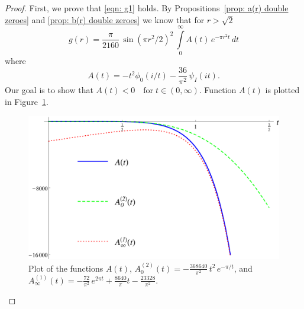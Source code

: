   \begin{proof}
  First, we prove that \eqref{eqn: g1} holds. By Propositions~\ref{prop: a(r) double zeroes} and \ref{prop: b(r) double zeroes} we know that for $r>\sqrt{2}$
  \begin{equation}\label{eqn: g A} g(r)=\frac{\pi}{2160}\,\sin(\pi r^2/2)^2\,\int\limits_0^\infty A(t)\,e^{-\pi r^2 t}\,dt\end{equation}
  where $$A(t)=-t^2\phi_0(i/t)-\frac{36}{\pi^2}\,\psi_I(it).$$
  Our goal is to show that $A(t)<0\quad\mbox{for}\;t\in(0,\infty).$ Function $A(t)$ is plotted in Figure~\ref{fig: A}.
  \begin{figure}[h!]
  \caption{Plot of the functions $A(t)$, $A^{(2)}_0(t)=-\frac{368640}{\pi^2}\,t^2\,e^{-\pi /t}$, and $A^{(1)}_\infty(t)=-\frac{72}{\pi^2}\,e^{2\pi t}+\frac{8640}{\pi}t-\frac{23328}{\pi^2}$.\label{fig: A}}
    \centering
  \includegraphics[width=300 pt]{graphics/e8plot_A.pdf}
  \end{figure}


\end{proof}
